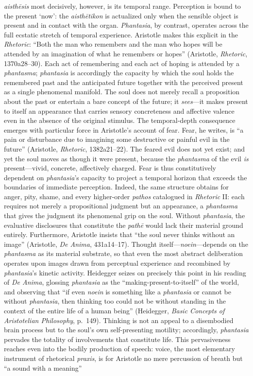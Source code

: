 \documentclass{article}
\begin{document}
\textit{aisth\={e}sis} most decisively, however, is its temporal range. Perception is bound to the present `now': the \textit{aisth\={e}tikon} is actualized only when the sensible object is present and in contact with the organ. \textit{Phantasia}, by contrast, operates across the full ecstatic stretch of temporal experience. Aristotle makes this explicit in the \textit{Rhetoric}: ``Both the man who remembers and the man who hopes will be attended by an imagination of what he remembers or hopes'' (Aristotle, \textit{Rhetoric}, 1370a28--30). Each act of remembering and each act of hoping is attended by a \textit{phantasma}; \textit{phantasia} is accordingly the capacity by which the soul holds the remembered past and the anticipated future together with the perceived present as a single phenomenal manifold. The soul does not merely recall a proposition about the past or entertain a bare concept of the future; it \textit{sees}---it makes present to itself an appearance that carries sensory concreteness and affective valence even in the absence of the original stimulus. The temporal-depth consequence emerges with particular force in Aristotle's account of fear. Fear, he writes, is ``a pain or disturbance due to imagining some destructive or painful evil in the future'' (Aristotle, \textit{Rhetoric}, 1382a21--22). The feared evil does not yet exist; and yet the soul moves as though it were present, because the \textit{phantasma} of the evil \textit{is} present---vivid, concrete, affectively charged. Fear is thus constitutively dependent on \textit{phantasia}'s capacity to project a temporal horizon that exceeds the boundaries of immediate perception. Indeed, the same structure obtains for anger, pity, shame, and every higher-order \textit{pathos} catalogued in \textit{Rhetoric} II: each requires not merely a propositional judgment but an appearance, a \textit{phantasma} that gives the judgment its phenomenal grip on the soul. Without \textit{phantasia}, the evaluative disclosures that constitute the \textit{path\={e}} would lack their material ground entirely. Furthermore, Aristotle insists that ``the soul never thinks without an image'' (Aristotle, \textit{De Anima}, 431a14--17). Thought itself---\textit{noein}---depends on the \textit{phantasma} as its material substrate, so that even the most abstract deliberation operates upon images drawn from perceptual experience and recombined by \textit{phantasia}'s kinetic activity. Heidegger seizes on precisely this point in his reading of \textit{De Anima}, glossing \textit{phantasia} as the ``making-present-to-itself'' of the world, and observing that ``if even \textit{noein} is something like a \textit{phantasia} or cannot be without \textit{phantasia}, then thinking too could not be without standing in the context of the entire life of a human being'' (Heidegger, \textit{Basic Concepts of Aristotelian Philosophy}, p.~149). Thinking is not an appeal to a disembodied brain process but to the soul's own self-presenting motility; accordingly, \textit{phantasia} pervades the totality of involvements that constitute life. This pervasiveness reaches even into the bodily production of speech: voice, the most elementary instrument of rhetorical \textit{praxis}, is for Aristotle no mere percussion of breath but ``a sound with a meaning'' 
\end{document}
